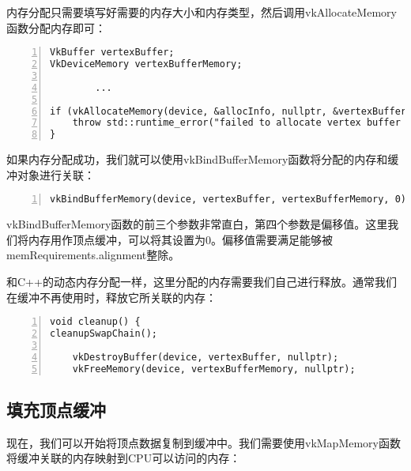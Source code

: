\documentclass{ctexart}
\begin{document}
内存分配只需要填写好需要的内存大小和内存类型，然后调用vkAllocateMemory函数分配内存即可：

\begin{lstlisting}[language={[ANSI]C},keywordstyle=\color{blue!70},commentstyle=\color{red!50!green!50!blue!50},frame=shadowbox, rulesepcolor=\color{red!20!green!20!blue!20},basicstyle=\small,numbers=left, numberstyle=\tiny,breaklines=true]
VkBuffer vertexBuffer;
VkDeviceMemory vertexBufferMemory;

		...

if (vkAllocateMemory(device, &allocInfo, nullptr, &vertexBufferMemory) != VK_SUCCESS) {
	throw std::runtime_error("failed to allocate vertex buffer memory!");
}
\end{lstlisting}

如果内存分配成功，我们就可以使用vkBindBufferMemory函数将分配的内存和缓冲对象进行关联：

\begin{lstlisting}[language={[ANSI]C},keywordstyle=\color{blue!70},commentstyle=\color{red!50!green!50!blue!50},frame=shadowbox, rulesepcolor=\color{red!20!green!20!blue!20},basicstyle=\small,numbers=left, numberstyle=\tiny,breaklines=true]
vkBindBufferMemory(device, vertexBuffer, vertexBufferMemory, 0);
\end{lstlisting}

vkBindBufferMemory函数的前三个参数非常直白，第四个参数是偏移值。这里我们将内存用作顶点缓冲，可以将其设置为0。偏移值需要满足能够被memRequirements.alignment整除。

和C++的动态内存分配一样，这里分配的内存需要我们自己进行释放。通常我们在缓冲不再使用时，释放它所关联的内存：

\begin{lstlisting}[language={[ANSI]C},keywordstyle=\color{blue!70},commentstyle=\color{red!50!green!50!blue!50},frame=shadowbox, rulesepcolor=\color{red!20!green!20!blue!20},basicstyle=\small,numbers=left, numberstyle=\tiny,breaklines=true]
void cleanup() {
cleanupSwapChain();

	vkDestroyBuffer(device, vertexBuffer, nullptr);
	vkFreeMemory(device, vertexBufferMemory, nullptr);
\end{lstlisting}

\subsection{填充顶点缓冲}

现在，我们可以开始将顶点数据复制到缓冲中。我们需要使用vkMapMemory函数将缓冲关联的内存映射到CPU可以访问的内存：
\end{document}

